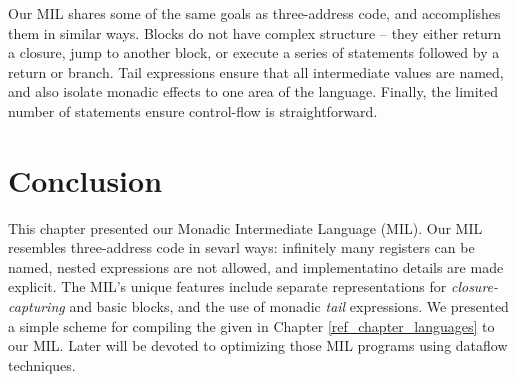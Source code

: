 \documentclass[12pt]{report}
\begin{document}
Our MIL shares some of the same goals as three-address code, and
accomplishes them in similar ways. Blocks do not have complex
structure -- they either return a closure, jump to another block, or
execute a series of statements followed by a return or branch. Tail
expressions ensure that all intermediate values are named, and also 
isolate monadic effects to one area of the language. Finally, the limited
number of statements ensure control-flow is straightforward.

\section{Conclusion}

This chapter presented our Monadic Intermediate Language (MIL). Our
MIL resembles three-address code in sevarl ways: infinitely many
registers can be named, nested expressions are not allowed, and
implementatino details are made explicit. The MIL's unique features
include separate representations for \emph{closure-capturing} and
basic blocks, and the use of monadic \emph{tail} expressions. We 
presented a simple scheme for compiling the \lamA given in
Chapter \ref{ref_chapter_languages} to our MIL. Later will be devoted
to optimizing those MIL programs using dataflow techniques.






\end{document}
